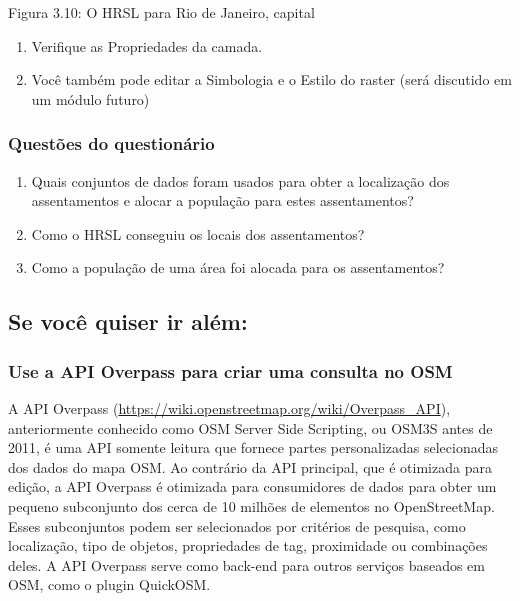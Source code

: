 \documentclass[
]{book}
\providecommand{\tightlist}{%
  \setlength{\itemsep}{0pt}\setlength{\parskip}{0pt}}
\begin{document}
Figura 3.10: O HRSL para Rio de Janeiro, capital

\begin{enumerate}
\def\labelenumi{\arabic{enumi}.}
\setcounter{enumi}{1}
\tightlist
\item
  Verifique as Propriedades da camada.
\item
  Você também pode editar a Simbologia e o Estilo do raster (será discutido em um módulo futuro)
\end{enumerate}

\hypertarget{questuxf5es-do-questionuxe1rio}{%
\subsubsection{\texorpdfstring{\textbf{Questões do questionário}}{Questões do questionário}}\label{questuxf5es-do-questionuxe1rio}}

\begin{enumerate}
\def\labelenumi{\arabic{enumi}.}
\tightlist
\item
  Quais conjuntos de dados foram usados para obter a localização dos assentamentos e alocar a população para estes assentamentos?
\item
  Como o HRSL conseguiu os locais dos assentamentos?
\item
  Como a população de uma área foi alocada para os assentamentos?
\end{enumerate}

\hypertarget{se-vocuxea-quiser-ir-aluxe9m}{%
\subsection{Se você quiser ir além:}\label{se-vocuxea-quiser-ir-aluxe9m}}

\hypertarget{use-a-api-overpass-para-criar-uma-consulta-no-osm}{%
\subsubsection{\texorpdfstring{\textbf{Use a API Overpass para criar uma consulta no OSM}}{Use a API Overpass para criar uma consulta no OSM}}\label{use-a-api-overpass-para-criar-uma-consulta-no-osm}}

A API Overpass (\href{https:/\%20/wiki.openstreetmap.org/wiki/Overpass_API}{https://wiki.openstreetmap.org/wiki/Overpass\_API}), anteriormente conhecido como OSM Server Side Scripting, ou OSM3S antes de 2011, é uma API somente leitura que fornece partes personalizadas selecionadas dos dados do mapa OSM. Ao contrário da API principal, que é otimizada para edição, a API Overpass é otimizada para consumidores de dados para obter um pequeno subconjunto dos cerca de 10 milhões de elementos no OpenStreetMap. Esses subconjuntos podem ser selecionados por critérios de pesquisa, como localização, tipo de objetos, propriedades de tag, proximidade ou combinações deles. A API Overpass serve como back-end para outros serviços baseados em OSM, como o plugin QuickOSM.
\end{document}
